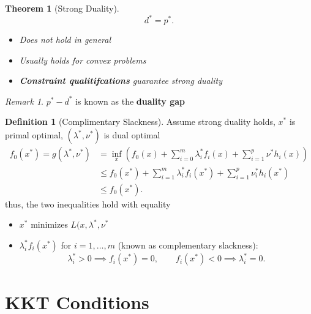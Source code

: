 \documentclass{report}
\newtheorem{theorem}{Theorem}[section]
\theoremstyle{remark} \newtheorem{remark}{Remark}[section]
\theoremstyle{definition}
\newtheorem{definition}{Definition}[section]
\theoremstyle{definition}
\theoremstyle{definition}
\theoremstyle{remark}
\begin{document}
\begin{theorem}[Strong Duality]
   \[
   d^{*} = p^{*}
   .\]  
   \begin{itemize}
       \item Does not hold in general
           \item Usually holds for convex problems
               \item \textbf{Constraint qualitifcations} guarantee strong duality
   \end{itemize}
   
       
\end{theorem}

\begin{remark}
    $p^{*} - d^{*}$ is known as the \textbf{duality gap}  
\end{remark}


\begin{definition}[Complimentary Slackness]
    Assume strong duality holds, $x^{*}$ is primal optimal, $(\lambda^{*},\nu^{*})$ is dual optimal
   \begin{align*}
        f_0(x^{*}) = g(\lambda^{*}, \nu^{*}) &= \inf_{x}(f_0(x) + \sum_{i=0}^{m} \lambda_i^{*}f_i(x) + \sum_{i=1}^{p} \nu^{*}h_i(x)) \\
                                             &\le f_0(x^{*}) + \sum_{i=1}^{m} \lambda_i^{*}f_i(x^{*})+\sum_{i=1}^{p} \nu_i^{*}h_i(x^{*}) \\
                                             &\le f_0(x^{*})
   .\end{align*} 
   thus, the two inequalities hold with equality  
   \begin{itemize}
       \item $x^{*}$ minimizes $L(x,\lambda^{*},\nu^{*}$
          \item $\lambda_i^{*}f_i(x^{*})$ for $i=1,\ldots,m$ (known as complementary slackness):
              \[
                  \lambda_i^{*} >0 \implies f_i(x^{*})=0,\qquad f_i(x^{*}) < 0 \implies \lambda_i^{*}=0
              .\] 
   \end{itemize}
\end{definition}


\section{KKT Conditions}
\end{document}
